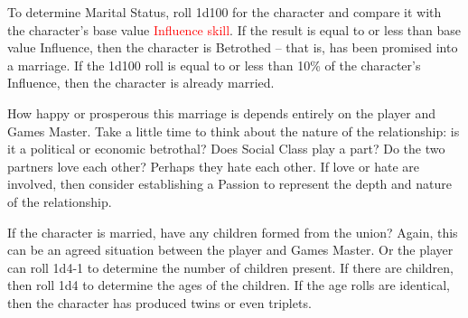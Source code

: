 \documentclass[10pt]{article}
\begin{document}
To determine Marital Status, roll 1d100 for the character and compare it with the character's base value \textcolor{red}{Influence skill}. If the result is equal to or less than base value Influence, then the character is Betrothed – that is, has been promised into a marriage. If the 1d100 roll is equal to or less than 10\% of the character's Influence, then the character is already married.

How happy or prosperous this marriage is depends entirely on the player and Games Master. Take a little time to think about the nature of the relationship: is it a political or economic betrothal? Does Social Class play a part? Do the two partners love each other? Perhaps they hate each other. If love or hate are involved, then consider establishing a Passion to represent the depth and nature of the relationship.

If the character is married, have any children formed from the union? Again, this can be an agreed situation between the player and Games Master. Or the player can roll 1d4-1 to determine the number of children present. If there are children, then roll 1d4 to determine the ages of the children. If the age rolls are identical, then the character has produced twins or even triplets.
\end{document}
